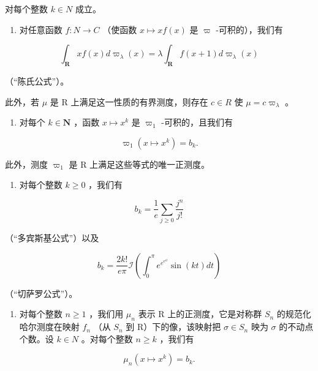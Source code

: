 对每个整数 \(k \in N\) 成立。

\begin{enumerate}
\def\labelenumi{\alph{enumi})}
\setcounter{enumi}{1}
\tightlist
\item
  对任意函数 \(f: N \to C\) （使函数 \(x \mapsto xf(x)\) 是 \(\varpi\) -可积的），我们有
\end{enumerate}

\[
\int_ {\mathbf {R}} x f (x) d \varpi_ {\lambda} (x) = \lambda \int_ {\mathbf {R}} f (x + 1) d \varpi_ {\lambda} (x)
\]

（“陈氏公式”）。

此外，若 \(\mu\) 是 R 上满足这一性质的有界测度，则存在 \(c \in R\) 使 \(\mu = c\varpi_{\lambda}\) 。

\begin{enumerate}
\def\labelenumi{\alph{enumi})}
\setcounter{enumi}{2}
\tightlist
\item
  对每个 \(k \in \mathbf{N}\) ，函数 \(x \mapsto x^k\) 是 \(\varpi_1\) -可积的，且我们有
\end{enumerate}

\[
\varpi_ {1} (x \mapsto x ^ {k}) = b _ {k}.
\]

此外，测度 \(\varpi_{1}\) 是 R 上满足这些等式的唯一正测度。

\begin{enumerate}
\def\labelenumi{\alph{enumi})}
\setcounter{enumi}{3}
\tightlist
\item
  对每个整数 \(k \geqslant 0\) ，我们有
\end{enumerate}

\[
b _ {k} = \frac {1}{e} \sum_ {j \geqslant 0} \frac {j ^ {n}}{j !}
\]

（“多宾斯基公式”）以及

\[
b _ {k} = \frac {2 k !}{e \pi} \mathcal {I} \left(\int_ {0} ^ {\pi} e ^ {e ^ {e ^ {i t}}} \sin (k t) d t\right)
\]

（“切萨罗公式”）。

\begin{enumerate}
\def\labelenumi{\alph{enumi})}
\setcounter{enumi}{4}
\tightlist
\item
  对每个整数 \(n \geqslant 1\) ，我们用 \(\mu_{n}\) 表示 R 上的正测度，它是对称群 \(S_{n}\) 的规范化哈尔测度在映射 \(f_{n}\) （从 \(S_{n}\) 到 R）下的像，该映射把 \(\sigma \in S_{n}\) 映为 \(\sigma\) 的不动点个数。设 \(k \in N\) 。对每个整数 \(n \geqslant k\) ，我们有
\end{enumerate}

\[
\mu_ {n} (x \mapsto x ^ {k}) = b _ {k}.
\]

